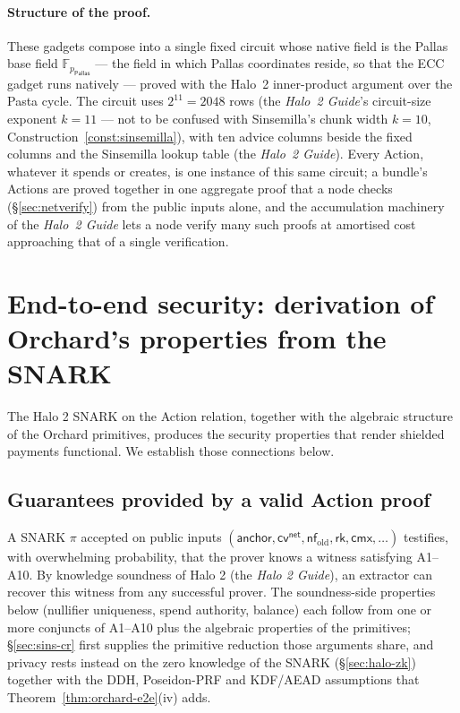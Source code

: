 \documentclass[11pt,a4paper]{article}
\theoremstyle{definition}
\newcommand{\F}{\mathbb{F}}
\newcommand{\nfsym}{\mathsf{nf}}
\newcommand{\cmx}{\mathsf{cmx}}
\newcommand{\cvsym}{\mathsf{cv}}
\newcommand{\rk}{\mathsf{rk}}
\newcommand{\Pallas}{\ensuremath{\mathsf{Pallas}}}
\begin{document}
\paragraph{Structure of the proof.} These gadgets compose into a single fixed
circuit whose native field is the Pallas base field $\F_{p_{\Pallas}}$ --- the
field in which Pallas coordinates reside, so that the ECC gadget runs natively ---
proved with the Halo~2 inner-product argument over the Pasta cycle. The
circuit uses $2^{11} = 2048$ rows (the \emph{Halo~2 Guide}'s circuit-size
exponent $k = 11$ --- not to be confused with Sinsemilla's chunk width
$k = 10$, Construction~\ref{const:sinsemilla}), with ten advice columns
beside the fixed columns and the Sinsemilla lookup table (the
\emph{Halo~2 Guide}). Every Action,
whatever it spends or creates, is one instance of this same circuit; a
bundle's Actions are proved together in one aggregate proof that a node
checks (\S\ref{sec:netverify}) from the public
inputs alone, and the accumulation machinery of the \emph{Halo~2 Guide} lets
a node verify many such proofs at amortised cost approaching that of a single
verification.

\section{End-to-end security: derivation of Orchard's properties from the SNARK}\label{sec:e2e-sec}

The Halo 2 SNARK on the Action relation, together with the algebraic structure of
the Orchard primitives, produces the security properties that render shielded
payments functional. We establish those connections below.

\subsection{Guarantees provided by a valid Action proof}\label{sec:what-proof-gives}

A SNARK $\pi$ accepted on public inputs
$(\mathsf{anchor}, \cvsym^{\mathsf{net}}, \nfsym_{\mathrm{old}}, \rk, \cmx, \ldots)$
testifies, with overwhelming probability, that the prover knows a
witness satisfying A1--A10. By knowledge soundness
of Halo 2 (the \emph{Halo 2 Guide}), an extractor can
recover this witness from any successful prover. The soundness-side
properties below (nullifier uniqueness, spend authority, balance) each
follow from one or more conjuncts of A1--A10 plus the algebraic properties
of the primitives; \S\ref{sec:sins-cr} first supplies the primitive
reduction those arguments share, and privacy rests instead on the zero
knowledge of the SNARK (\S\ref{sec:halo-zk}) together with the DDH,
Poseidon-PRF and KDF/AEAD assumptions that
Theorem~\ref{thm:orchard-e2e}(iv) adds.
\end{document}
